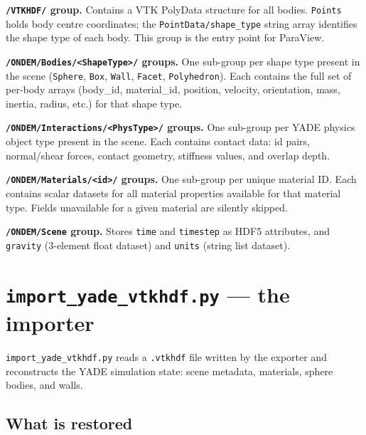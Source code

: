 \documentclass[11pt,a4paper]{article}
\begin{document}
\medskip
\noindent\textbf{\texttt{/VTKHDF/} group.} Contains a VTK PolyData structure
for all bodies. \texttt{Points} holds body centre coordinates; the
\texttt{PointData/shape\_type} string array identifies the shape type of each
body. This group is the entry point for ParaView.

\medskip
\noindent\textbf{\texttt{/ONDEM/Bodies/<ShapeType>/} groups.} One sub-group
per shape type present in the scene (\texttt{Sphere}, \texttt{Box},
\texttt{Wall}, \texttt{Facet}, \texttt{Polyhedron}). Each contains the full
set of per-body arrays (body\_id, material\_id, position, velocity,
orientation, mass, inertia, radius, etc.) for that shape type.

\medskip
\noindent\textbf{\texttt{/ONDEM/Interactions/<PhysType>/} groups.} One
sub-group per YADE physics object type present in the scene. Each contains
contact data: id pairs, normal/shear forces, contact geometry, stiffness
values, and overlap depth.

\medskip
\noindent\textbf{\texttt{/ONDEM/Materials/<id>/} groups.} One sub-group per
unique material ID. Each contains scalar datasets for all material properties
available for that material type. Fields unavailable for a given material are
silently skipped.

\medskip
\noindent\textbf{\texttt{/ONDEM/Scene} group.} Stores \texttt{time} and
\texttt{timestep} as HDF5 attributes, and \texttt{gravity} (3-element float
dataset) and \texttt{units} (string list dataset).

\section{\texttt{import\_yade\_vtkhdf.py} --- the importer}
\label{sec:importer}

\texttt{import\_yade\_vtkhdf.py} reads a \texttt{.vtkhdf} file written by
the exporter and reconstructs the YADE simulation state: scene metadata,
materials, sphere bodies, and walls.

\subsection{What is restored}
\end{document}

